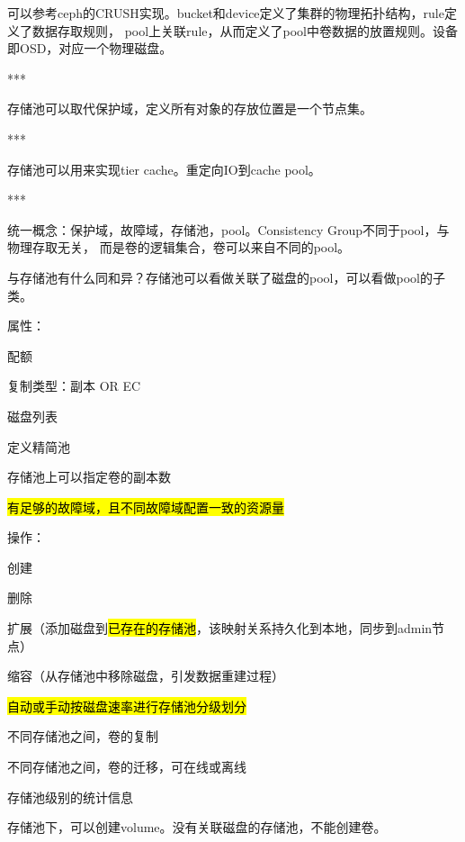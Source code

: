 \begin{tcolorbox}

可以参考ceph的CRUSH实现。bucket和device定义了集群的物理拓扑结构，rule定义了数据存取规则，
pool上关联rule，从而定义了pool中卷数据的放置规则。设备即OSD，对应一个物理磁盘。

***

存储池可以取代保护域，定义所有对象的存放位置是一个节点集。

***

存储池可以用来实现tier cache。重定向IO到cache pool。

***

统一概念：保护域，故障域，存储池，pool。Consistency Group不同于pool，与物理存取无关，
而是卷的逻辑集合，卷可以来自不同的pool。

\end{tcolorbox}

与存储池有什么同和异？存储池可以看做关联了磁盘的pool，可以看做pool的子类。

属性：
\begin{enumbox}
\item 配额
\item 复制类型：副本 OR EC
\item 磁盘列表
\item 定义精简池
\item 存储池上可以指定卷的副本数
\item \hl{有足够的故障域，且不同故障域配置一致的资源量}
\end{enumbox}

操作：
\begin{enumbox}
\item 创建
\item 删除
\item 扩展（添加磁盘到\hl{已存在的存储池}，该映射关系持久化到本地，同步到admin节点）
\item 缩容（从存储池中移除磁盘，引发数据重建过程）
\item \hl{自动或手动按磁盘速率进行存储池分级划分}
\item 不同存储池之间，卷的复制
\item 不同存储池之间，卷的迁移，可在线或离线
\item 存储池级别的统计信息
\end{enumbox}


存储池下，可以创建volume。没有关联磁盘的存储池，不能创建卷。

